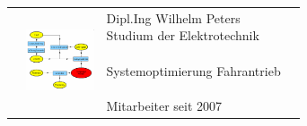 \begin{tabular}{p{2.1cm}p{6cm}p{2cm}p{6cm}}
	&	\parbox[c]{2cm}{\includegraphics[width=2cm]{Bilder/toolkit.eps}}  	\hfill 	
	& \parbox[c]{5.9cm}{
			Dipl.Ing Wilhelm Peters\\
			Studium der Elektrotechnik\\
			\\
			Systemoptimierung Fahrantrieb\\
			\\
			Mitarbeiter seit 2007
			\\
		}\\
\end{tabular}
